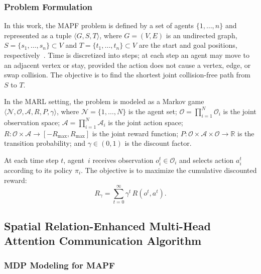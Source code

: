 \documentclass[sigconf]{acmart}
\begin{document}
\subsubsection{Problem Formulation}

In this work, the MAPF problem is defined by a set of agents
$\{1,\ldots,n\}$ and represented as a tuple
$\langle G, S, T \rangle$, where $G=(V,E)$ is an undirected graph,
$S=\{s_1,\ldots,s_n\}\subset V$ and
$T=\{t_1,\ldots,t_n\}\subset V$ are the start and goal positions,
respectively~\cite{chung2024review}.
Time is discretized into steps; at each step an agent may move to
an adjacent vertex or stay, provided the action does not cause a
vertex, edge, or swap collision.
The objective is to find the shortest joint collision-free path
from $S$ to $T$.

In the MARL setting, the problem is modeled as a Markov game
$\langle \mathcal{N}, \mathcal{O}, \mathcal{A}, R, P, \gamma
\rangle$, where
$\mathcal{N}=\{1,\ldots,N\}$ is the agent set;
$\mathcal{O}=\prod_{i=1}^{N}\mathcal{O}_i$ is the joint
observation space;
$\mathcal{A}=\prod_{i=1}^{N}\mathcal{A}_i$ is the joint action
space;
$R:\mathcal{O}\times\mathcal{A}\to[-R_{\max},R_{\max}]$ is the
joint reward function;
$P:\mathcal{O}\times\mathcal{A}\times\mathcal{O}\to\mathbb{R}$
is the transition probability; and
$\gamma\in(0,1)$ is the discount factor.

At each time step $t$, agent~$i$ receives observation
$o_i^t\in\mathcal{O}_i$ and selects action $a_i^t$ according to
its policy $\pi_i$.
The objective is to maximize the cumulative discounted reward:
\begin{equation}\label{eq:return}
  R_\gamma = \sum_{t=0}^{\infty} \gamma^t\, R(o^t, a^t).
\end{equation}

\subsection{Spatial Relation-Enhanced Multi-Head Attention
Communication Algorithm}

\subsubsection{MDP Modeling for MAPF}
\end{document}
